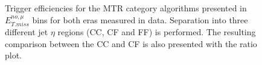 \begin{figure}[htbp]
  \centering
  \caption{Trigger efficiencies for the MTR category algorithms presented in $E_{T.miss}^{no,\mu}$ bins for both eras measured in data. Separation into three different jet $\eta$ regions (CC, CF and FF) is performed. The resulting comparison between the CC and CF is also presented with the ratio plot. }
  \label{fig:metmht_test}
\end{figure}




